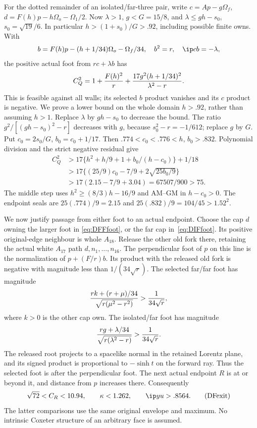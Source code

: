 For the dotted remainder of an isolated/far-three pair,
write \(c=Ap-g\Omega_f\), \(d=F(h)p-h\Omega_o-\Omega_1/2\).
Now \(\lambda>1\), \(g<G=15/8\), and
\(\lambda\le gh-s_0\), \(s_0=\sqrt{19}/6\).
In particular \(h>(1+s_0)/G>.92\), including possible finite owns.
With
\[
 b=F(h)p-(h+1/34)\Omega_o-\Omega_f/34,\quad b^2=r,\quad
 \ip cb=-\lambda,
\]
the positive actual foot from \(rc+\lambda b\) has
\[
 C_Q^2=1+{F(h)^2\over r}
           +{17g^2(h+1/34)^2\over\lambda^2-r}.
\]
This is feasible against all walls; its selected \(b\) product
vanishes and its \(c\) product is negative.
We prove a lower bound on the whole domain \(h>.92\),
rather than assuming \(h>1\).
Replace \(\lambda\) by \(gh-s_0\) to decrease the bound.
The ratio \(g^2/[(gh-s_0)^2-r]\) decreases with \(g\),
because \(s_0^2-r=-1/612\); replace \(g\) by \(G\).
Put \(c_0=2s_0/G\), \(b_0=c_0+1/17\).
Then \(.774<c_0<.776<h\), \(b_0>.832\).
Polynomial division and the strict negative residual give
\[
 \begin{split}
 C_Q^2&>17\{h^2+h/9+1+b_0/(h-c_0)\}+1/18\\
 &>17\{(25/9)c_0-7/9+2\sqrt{25b_0/9}\}\\
 &>17(2.15-7/9+3.04)=67507/900>75.
 \end{split}
\tag{DIFfoot}\label{eq:DIFfoot}
\]
The middle step uses \(h^2\ge(8/3)h-16/9\) and
AM--GM in \(h-c_0>0\).
The endpoint seals are \(25(.774)/9=2.15\) and
\(25(.832)/9=104/45>1.52^2\).

We now justify passage from either foot to an actual endpoint.
Choose the cap \(d\) owning the larger foot in
\eqref{eq:DFFfoot}, or the far cap in~\eqref{eq:DIFfoot}.
Its positive original-edge neighbour is whole \(A_{18}\).
Release the other old fork there, retaining the actual white
\(A_{17}\) path \(d,n_1,\ldots,n_{16}\).
The perpendicular foot of \(p\) on this line is the normalization of
\(p+(F/r)b\).
Its product with the released old fork is negative with magnitude
less than \(1/(34\sqrt r)\).
The selected far/far foot has magnitude
\[
 {rk+(r+\mu)/34\over\sqrt{r(\mu^2-r^2)}}
                  >{1\over34\sqrt r},
\]
where \(k>0\) is the other cap own.
The isolated/far foot has magnitude
\[
 {rg+\lambda/34\over\sqrt{r(\lambda^2-r)}}
                  >{1\over34\sqrt r}.
\]
The released root projects to a spacelike normal in the retained
Lorentz plane, and its signed product is proportional to
\(-\sinh t\) on the forward ray.
Thus the selected foot is after the perpendicular foot.
The next actual endpoint \(R\) is at or beyond it, and distance
from \(p\) increases there.  Consequently
\[
 \sqrt{72}<C_R<10.94,\qquad
 \kappa<1.262,\qquad\ip yu>.8564.
\tag{DFexit}\label{eq:DFexit}
\]
The latter comparisons use the same original envelope and maximum.
No intrinsic Coxeter structure of an arbitrary face is assumed.


